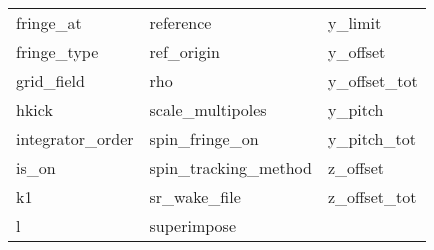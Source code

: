 \begin{tabular}{lll}
fringe_at                   & reference                   & y_limit                     \\
fringe_type                 & ref_origin                  & y_offset                    \\
grid_field                  & rho                         & y_offset_tot                \\
hkick                       & scale_multipoles            & y_pitch                     \\
integrator_order            & spin_fringe_on              & y_pitch_tot                 \\
is_on                       & spin_tracking_method        & z_offset                    \\
k1                          & sr_wake_file                & z_offset_tot                \\
l                           & superimpose                 &                             \\
 \bottomrule
 \end{tabular}
 \vfill
 
